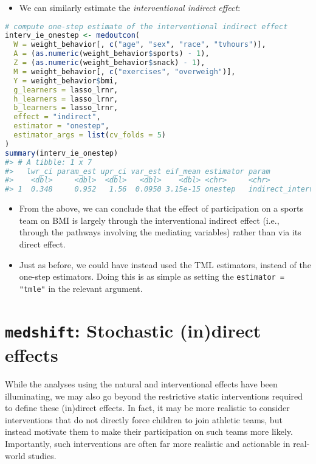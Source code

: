 \documentclass[
  12pt,
]{book}
\newcommand{\passthrough}[1]{#1}
\providecommand{\tightlist}{%
  \setlength{\itemsep}{0pt}\setlength{\parskip}{0pt}}
\theoremstyle{definition}
\theoremstyle{definition}
\theoremstyle{definition}
\newcommand{\1}{\mathbbm{1}}
\begin{document}
\begin{itemize}
\tightlist
\item
  We can similarly estimate the \emph{interventional indirect effect}:
\end{itemize}

\begin{lstlisting}[language=R]
# compute one-step estimate of the interventional indirect effect
interv_ie_onestep <- medoutcon(
  W = weight_behavior[, c("age", "sex", "race", "tvhours")],
  A = (as.numeric(weight_behavior$sports) - 1),
  Z = (as.numeric(weight_behavior$snack) - 1),
  M = weight_behavior[, c("exercises", "overweigh")],
  Y = weight_behavior$bmi,
  g_learners = lasso_lrnr,
  h_learners = lasso_lrnr,
  b_learners = lasso_lrnr,
  effect = "indirect",
  estimator = "onestep",
  estimator_args = list(cv_folds = 5)
)
summary(interv_ie_onestep)
#> # A tibble: 1 x 7
#>   lwr_ci param_est upr_ci var_est eif_mean estimator param                  
#>    <dbl>     <dbl>  <dbl>   <dbl>    <dbl> <chr>     <chr>                  
#> 1  0.348     0.952   1.56  0.0950 3.15e-15 onestep   indirect_interventional
\end{lstlisting}

\begin{itemize}
\tightlist
\item
  From the above, we can conclude that the effect of participation on a sports
  team on BMI is largely through the interventional indirect effect (i.e.,
  through the pathways involving the mediating variables) rather than via its
  direct effect.
\item
  Just as before, we could have instead used the TML estimators, instead of the
  one-step estimators. Doing this is as simple as setting the
  \passthrough{\lstinline!estimator = "tmle"!} in the relevant argument.
\end{itemize}

\hypertarget{medshift-stochastic-indirect-effects}{%
\section{\texorpdfstring{\texttt{medshift}: Stochastic (in)direct effects}{medshift: Stochastic (in)direct effects}}\label{medshift-stochastic-indirect-effects}}

While the analyses using the natural and interventional effects have been
illuminating, we may also go beyond the restrictive static interventions
required to define these (in)direct effects. In fact, it may be more realistic
to consider interventions that do not directly force children to join athletic
teams, but instead motivate them to make their participation on such teams more
likely. Importantly, such interventions are often far more realistic and
actionable in real-world studies.
\end{document}
